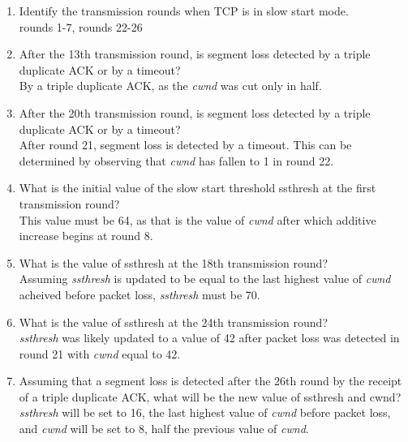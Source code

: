 \documentclass[10pt]{amsart}
\begin{document}
\begin{enumerate}
        \begin{enumerate}
            \item Identify the transmission rounds when TCP is in slow start
                mode.\\
                rounds 1-7, rounds 22-26
            \item After the 13th transmission round, is segment loss detected by
                a triple duplicate ACK or by a timeout?\\
                By a triple duplicate ACK, as the \textit{cwnd} was cut only in
                half.
            \item After the 20th transmission round, is segment loss detected by
                a triple duplicate ACK or by a timeout?\\
                After round 21, segment loss is detected by a timeout.  This can
                be determined by observing that \textit{cwnd} has fallen to 1 in
                round 22.
            \item What is the initial value of the slow start threshold ssthresh
                at the first transmission round?\\
                This value must be 64, as that is the value of \textit{cwnd}
                after which additive increase begins at round 8.
            \item What is the value of ssthresh at the 18th transmission
                round?\\
                Assuming \textit{ssthresh} is updated to be equal to the last
                highest value of \textit{cwnd} acheived before packet loss,
                \textit{ssthresh} must be 70.
            \item What is the value of ssthresh at the 24th transmission
                round?\\
                \textit{ssthresh} was likely updated to a value of 42 after
                packet loss was detected in round 21 with \textit{cwnd} equal to
                42.
            \item Assuming that a segment loss is detected after the 26th round
                by the receipt of a triple duplicate ACK, what will be the new
                value of ssthresh and cwnd?\\
                \textit{ssthresh} will be set to 16, the last highest value of
                \textit{cwnd} before packet loss, and \textit{cwnd} will be set
                to 8, half the previous value of \textit{cwnd}.
        \end{enumerate}
    \end{enumerate}
\end{document}

